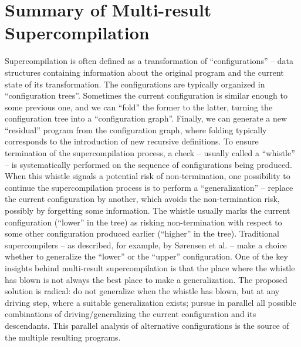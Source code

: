 \documentclass[submission,copyright,creativecommons]{eptcs}
\begin{document}
\section{Summary of Multi-result Supercompilation}\label{sec:MRSCSummary}

Supercompilation is often defined as a transformation of ``configurations'' --
data structures containing information about the original program and the
current state of its transformation.
The configurations are typically organized in ``configuration trees''.
Sometimes the current configuration is similar enough to some previous one,
and we can ``fold'' the former to the latter,
turning the configuration tree into a ``configuration graph''.
Finally, we can generate a new ``residual'' program from the configuration
graph, where folding typically corresponds to the introduction of new
recursive definitions.
To ensure termination of the supercompilation process, a check -- usually called 
a ``whistle'' -- is systematically performed on the sequence of configurations
being produced.
When this whistle signals a potential risk of non-termination, one possibility
to continue the supercompilation process is to perform a ``generalization'' --
replace the current configuration by another, which avoids the non-termination
risk, possibly by forgetting some information.
The whistle usually marks the current configuration (``lower'' in the tree) as risking
non-termination with respect to some other configuration produced earlier (``higher'' in the tree).
Traditional supercompilers -- as described, for example, by S{\o}rensen et al. \cite{sorm98b} --
make a choice whether to generalize the ``lower'' or the ``upper'' configuration.
One of the key insights behind multi-result supercompilation is that the place
where the whistle has blown is not always the best place to make a generalization.
The proposed solution is radical: do not generalize when the whistle has blown,
but at any driving step, where a suitable generalization exists;
pursue in parallel all possible combinations of driving/generalizing 
the current configuration and its descendants.
This parallel analysis of alternative configurations is the source
of the multiple resulting programs.
\end{document}
